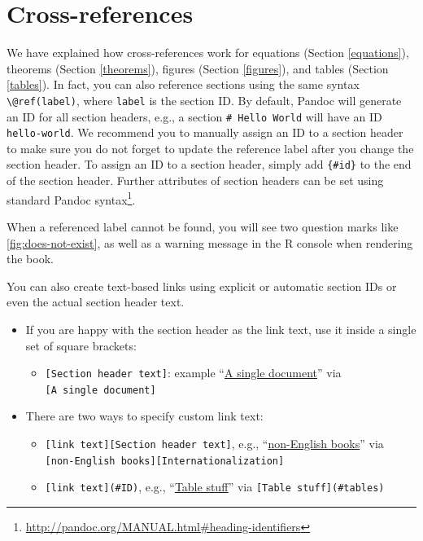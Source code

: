\documentclass[
  12pt,
]{krantz}
\providecommand{\tightlist}{%
  \setlength{\itemsep}{0pt}\setlength{\parskip}{0pt}}
\renewcommand{\href}[2]{#2\footnote{\url{#1}}}
\theoremstyle{definition}
\theoremstyle{definition}
\theoremstyle{definition}
\theoremstyle{definition}
\theoremstyle{remark}
\begin{document}
\section{Cross-references}\label{cross-references}

We have explained how cross-references work for equations (Section \ref{equations}), theorems (Section \ref{theorems}), figures (Section \ref{figures}), and tables (Section \ref{tables}). In fact, you can also reference sections using the same syntax \texttt{\textbackslash{}@ref(label)}, where \texttt{label} is the section ID. By default, Pandoc will generate an ID for all section headers, e.g., a section \texttt{\#\ Hello\ World} will have an ID \texttt{hello-world}. We recommend you to manually assign an ID to a section header to make sure you do not forget to update the reference label after you change the section header. To assign an ID to a section header, simply add \texttt{\{\#id\}} to the end of the section header. Further attributes of section headers can be set using standard \href{http://pandoc.org/MANUAL.html\#heading-identifiers}{Pandoc syntax}.

When a referenced label cannot be found, you will see two question marks like \ref{fig:does-not-exist}, as well as a warning message in the R console when rendering the book.

You can also create text-based links using explicit or automatic section IDs or even the actual section header text.

\begin{itemize}
\tightlist
\item
  If you are happy with the section header as the link text, use it inside a single set of square brackets:

  \begin{itemize}
  \tightlist
  \item
    \texttt{{[}Section\ header\ text{]}}: example ``\hyperref[a-single-document]{A single document}'' via \texttt{{[}A\ single\ document{]}}
  \end{itemize}
\item
  There are two ways to specify custom link text:

  \begin{itemize}
  \tightlist
  \item
    \texttt{{[}link\ text{]}{[}Section\ header\ text{]}}, e.g., ``\hyperref[internationalization]{non-English books}'' via \texttt{{[}non-English\ books{]}{[}Internationalization{]}}
  \item
    \texttt{{[}link\ text{]}(\#ID)}, e.g., ``\hyperref[tables]{Table stuff}'' via \texttt{{[}Table\ stuff{]}(\#tables)}
  \end{itemize}
\end{itemize}
\end{document}
